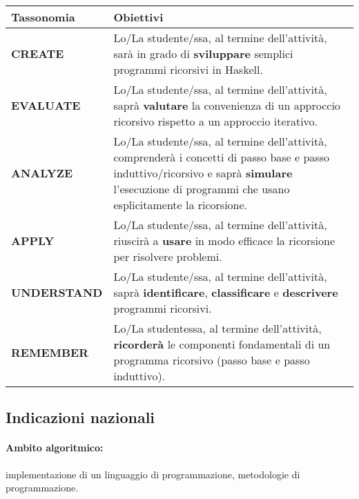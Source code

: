 \begin{center}
    \begin{tabular}{ || C{3cm} | >{}p{8.3cm} ||}
    \hline\hline
    \textbf{Tassonomia} & \textbf{Obiettivi}\\ \hline
        \textbf{CREATE} & Lo/La studente/ssa, al termine dell'attività, 
        sarà in grado di \textbf{sviluppare} semplici programmi ricorsivi in Haskell. \\\hline

        \textbf{EVALUATE} & Lo/La studente/ssa, al termine dell'attività,
        saprà \textbf{valutare} la convenienza di un approccio ricorsivo rispetto a un 
        approccio iterativo.\\\hline

        \textbf{ANALYZE} &  Lo/La studente/ssa, al termine dell'attività,
        comprenderà i concetti di passo base e passo induttivo/ricorsivo e 
        saprà \textbf{simulare} l'esecuzione di programmi che usano esplicitamente
        la ricorsione.\\\hline

        \textbf{APPLY} & Lo/La studente/ssa, al termine dell'attività,
        riuscirà a \textbf{usare} in modo efficace la ricorsione per risolvere
        problemi. \\\hline

        \textbf{UNDERSTAND} &  Lo/La studente/ssa, al termine dell'attività,
        saprà \textbf{identificare}, \textbf{classificare} e \textbf{descrivere} programmi ricorsivi. \\\hline

        \textbf{REMEMBER} &  Lo/La studentessa, al termine dell'attività,
        \textbf{ricorderà} le componenti fondamentali di un programma ricorsivo 
        (passo base e passo induttivo).\\\hline

    \hline
    \end{tabular}
\end{center}


\subsection{Indicazioni nazionali}

\paragraph{Ambito algoritmico:}  implementazione di un linguaggio di programmazione, metodologie di programmazione.

